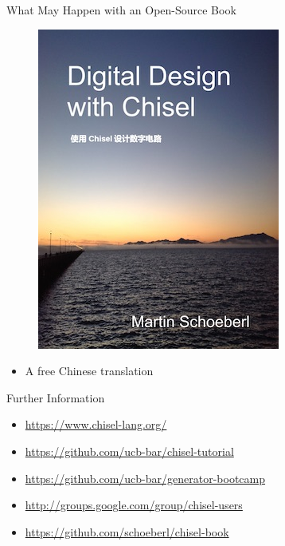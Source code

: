 \begin{frame}[fragile]{What May Happen with an Open-Source Book}
\begin{figure}
    \centering
    \includegraphics[scale=0.4]{../cover-small-chinese}
\end{figure}

\begin{itemize}
\item A free Chinese translation
\end{itemize}
\end{frame}

\begin{frame}[fragile]{Further Information}
\begin{itemize}
\item \url{https://www.chisel-lang.org/}
\item \url{https://github.com/ucb-bar/chisel-tutorial}
\item \url{https://github.com/ucb-bar/generator-bootcamp}
\item \url{http://groups.google.com/group/chisel-users}
\item \url{https://github.com/schoeberl/chisel-book}
\end{itemize}
\end{frame}


